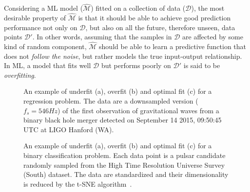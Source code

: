 		Considering a ML model ($\mathcal{\hat M}$) fitted on a collection of data ($\mathcal{D}$), the most desirable property of $\mathcal{\hat M}$ is that it should be able to achieve good prediction performance not only on $\mathcal{D}$, but also on all the future, therefore unseen, data points $\mathcal{D}'$.
		In other words, assuming that the samples in $\mathcal{D}$ are affected by some kind of random component, $\mathcal{\hat M}$ should be able to learn a predictive function that does not \textit{follow the noise}, but rather models the true input-output relationship.
		In ML, a model that fits well $\mathcal{D}$ but performs poorly on $\mathcal{D}'$ is said to be \textit{overfitting}.

	  \begin{figure}[!h]
	  	\centering
	      \hfill%
	  	\caption{An example of underfit (a), overfit (b) and optimal fit (c) for a regression problem. The data are a downsampled version ($f_s = 546 Hz$) of the first observation of gravitational waves from a binary black hole merger detected on September 14 2015, 09:50:45 UTC at LIGO Hanford (WA).}\label{fig:regression_fit}
	  \end{figure}

	  \begin{figure}[!h]
			\centering
			\hfill%
			\caption{An example of underfit (a), overfit (b) and optimal fit (c) for a binary classification problem. Each data point is a pulsar candidate randomly sampled from the High Time Resolution Universe Survey (South) dataset. The data are standardized and their dimensionality is reduced by the t-SNE algorithm~\cite{van2008visualizing}. }\label{fig:classification_fit}
	  \end{figure}


